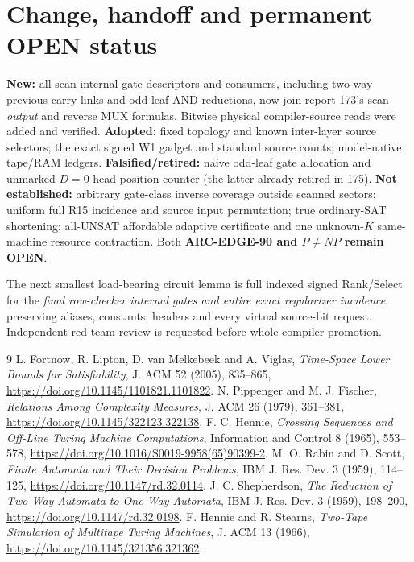 \documentclass[11pt]{article}
\newcommand{\OPEN}{\textbf{OPEN}}
\begin{document}
\section{Change, handoff and permanent OPEN status}
\textbf{New:} all scan-internal gate descriptors and consumers, including two-way previous-carry links and odd-leaf AND reductions, now join report 173's scan \emph{output} and reverse MUX formulas. Bitwise physical compiler-source reads were added and verified. \textbf{Adopted:} fixed topology and known inter-layer source selectors; the exact signed W1 gadget and standard source counts; model-native tape/RAM ledgers. \textbf{Falsified/retired:} naive odd-leaf gate allocation and unmarked $D=0$ head-position counter (the latter already retired in 175). \textbf{Not established:} arbitrary gate-class inverse coverage outside scanned sectors; uniform full R15 incidence and source input permutation; true ordinary-SAT shortening; all-UNSAT affordable adaptive certificate and one unknown-$K$ same-machine resource contraction. Both \textbf{ARC-EDGE-90 and $P\ne NP$ remain \OPEN}.\par
The next smallest load-bearing circuit lemma is full indexed signed Rank/Select for the \emph{final row-checker internal gates and entire exact regularizer incidence}, preserving aliases, constants, headers and every virtual source-bit request. Independent red-team review is requested before whole-compiler promotion.

\begin{thebibliography}{9}
 L. Fortnow, R. Lipton, D. van Melkebeek and A. Viglas, \emph{Time-Space Lower Bounds for Satisfiability}, J. ACM 52 (2005), 835--865, \url{https://doi.org/10.1145/1101821.1101822}.
 N. Pippenger and M. J. Fischer, \emph{Relations Among Complexity Measures}, J. ACM 26 (1979), 361--381, \url{https://doi.org/10.1145/322123.322138}.
 F. C. Hennie, \emph{Crossing Sequences and Off-Line Turing Machine Computations}, Information and Control 8 (1965), 553--578, \url{https://doi.org/10.1016/S0019-9958(65)90399-2}.
 M. O. Rabin and D. Scott, \emph{Finite Automata and Their Decision Problems}, IBM J. Res. Dev. 3 (1959), 114--125, \url{https://doi.org/10.1147/rd.32.0114}.
 J. C. Shepherdson, \emph{The Reduction of Two-Way Automata to One-Way Automata}, IBM J. Res. Dev. 3 (1959), 198--200, \url{https://doi.org/10.1147/rd.32.0198}.
 F. Hennie and R. Stearns, \emph{Two-Tape Simulation of Multitape Turing Machines}, J. ACM 13 (1966), \url{https://doi.org/10.1145/321356.321362}.
\end{thebibliography}
\end{document}
